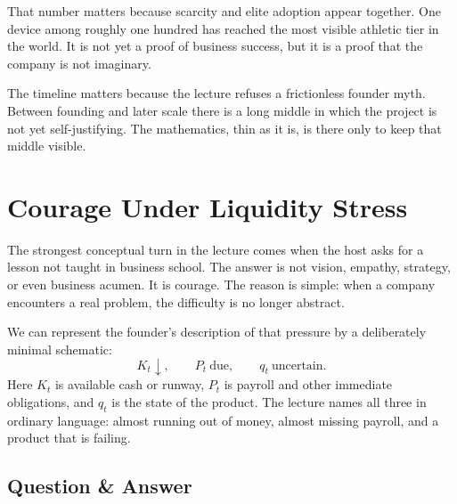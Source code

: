 That number matters because scarcity and elite adoption appear together. One device among roughly one hundred has reached the most visible athletic tier in the world. It is not yet a proof of business success, but it is a proof that the company is not imaginary.

\begin{figure}
\centering
{}
\end{figure}

The timeline matters because the lecture refuses a frictionless founder myth. Between founding and later scale there is a long middle in which the project is not yet self-justifying. The mathematics, thin as it is, is there only to keep that middle visible.

\section{Courage Under Liquidity Stress}

The strongest conceptual turn in the lecture comes when the host asks for a lesson not taught in business school. The answer is not vision, empathy, strategy, or even business acumen. It is courage. The reason is simple: when a company encounters a real problem, the difficulty is no longer abstract.

We can represent the founder's description of that pressure by a deliberately minimal schematic:
\begin{equation}
K_t \downarrow,
\qquad
P_t\ \text{due},
\qquad
q_t\ \text{uncertain}.
\end{equation}
Here \(K_t\) is available cash or runway, \(P_t\) is payroll and other immediate obligations, and \(q_t\) is the state of the product. The lecture names all three in ordinary language: almost running out of money, almost missing payroll, and a product that is failing.

\subsection{Question \& Answer}

